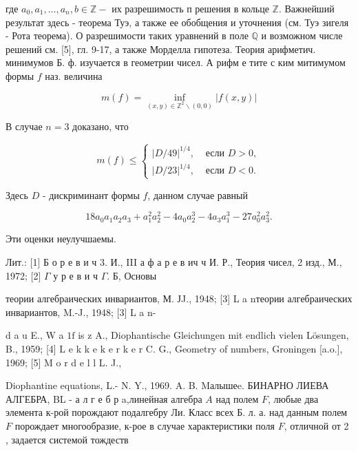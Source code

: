 \documentclass[10pt]{article}
\begin{document}
где $a_{0}, a_{1}, \ldots, a_{n}, b \in \mathbb{Z}-$ их разрешимость п решения в кольце $\mathbb{Z}$. Важнейший результат здесь - теорема Туэ, а также ее обобщения и уточнения (см. Туэ зигеля - Рота теорема). О разрешимости таких уравнений в поле $\mathbb{Q}$ и возможном числе решений см. [5], гл. 9-17, а также Морделла гипотеза. Теория арифметич. минимумов Б. ф. изучается в геометрии чисел. А рифм е тите с ким митимумом формы $f$ наз. величина



\[

m(f)=\inf _{(x, y) \in \mathbb{Z}^{2} \backslash(0,0)}|f(x, y)|

\]



В случае $n=3$ доказано, что



\[

m(f) \leqslant\left\{\begin{array}{lll}

|D / 49|^{1 / 4}, & \text { если } D>0, \\

|D / 23|^{1 / 4}, & \text { если } D<0 .

\end{array}\right.

\]



Здесь $D$ - дискриминант формы $f$, данном случае равный



\[

18 a_{0} a_{1} a_{2} a_{3}+a_{1}^{2} a_{2}^{2}-4 a_{0} a_{2}^{3}-4 a_{3} a_{1}^{3}-27 a_{0}^{2} a_{3}^{2} .

\]



Эти оценки неулучшаемы.



Лит.: [1] Б о р е в и ч 3. И., III а ф а р е в ич ч И. Р., Теория чисел, 2 изд., М., 1972; [2] $\Gamma$ у р е в и ч $\Gamma$. Б, Основы

теории алгебраических инвариантов, М. ЈJ., 1948; [3] L a nтеории алгебраических инвариантов, M.-J., 1948; [3] L a n-

d a u E., W a $1 \mathrm{f}$ is z A., Diophantische Gleichungen mit endlich vielen Lösungen, B., 1959; [4] $\mathrm{L}$ e k k e $\mathrm{k}$ e r k e r C. G., Geometry of numbers, Groningen [a.o.], 1969; [5] M o r d e l l L. J.,

Diophantine equations, L.- N. Y., 1969. A. B. Mалышеe. БИНАРНО ЛИЕВА АЛГЕБРА, BL - а л г е б р a,линейная алгебра $A$ над полем $F$, любые два элемента к-рой порождают подалгебру Ли. Класс всех Б. л. а. над данным полем $F$ порождает многообразие, к-рое в случае характеристики поля $F$, отличной от 2 , задается системой тождеств
\end{document}
